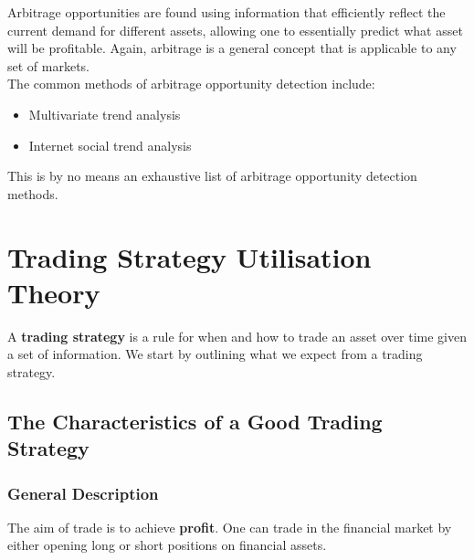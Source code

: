 \documentclass[11pt]{article}
\begin{document}
Arbitrage opportunities are found using information that efficiently reflect the current demand for different assets, allowing one to essentially predict what asset will be profitable. 
\nolinebreak
Again, arbitrage is a general concept that is applicable to any set of markets.\\

The common methods of arbitrage opportunity detection include:
\begin{itemize}
    
    \item Multivariate trend analysis
    
    \item Internet social trend analysis
    
\end{itemize}

This is by no means an exhaustive list of arbitrage opportunity detection methods.

\section{Trading Strategy Utilisation Theory}

A \textbf{trading strategy} is a rule for when and how to trade an asset over time given a set of information.
\nolinebreak
We start by outlining what we expect from a trading strategy.

\subsection{The Characteristics of a Good Trading Strategy}

\subsubsection{General Description}

The aim of trade is to achieve \textbf{profit}. 
\nolinebreak
One can trade in the financial market by either opening long or short positions on financial assets.\\
\end{document}

